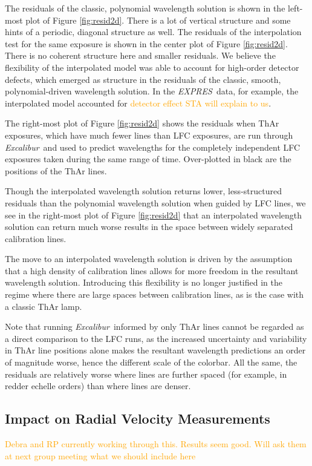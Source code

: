 \documentclass[modern]{aastex63}
\newcommand{\project}[1]{\textsl{#1}}
\newcommand{\name}{\project{Excalibur}}
\newcommand{\acronym}[1]{{\small{#1}}}
\newcommand{\expres}{\project{\acronym{EXPRES}}}
\newcommand{\lz}[1]{\textcolor{orange}{#1}}
\begin{document}
The residuals of the classic, polynomial wavelength solution is shown in the left-most plot of Figure \ref{fig:resid2d}.  There is a lot of vertical structure and some hints of a periodic, diagonal structure as well.  The residuals of the interpolation test for the same exposure is shown in the center plot of Figure \ref{fig:resid2d}.  There is no coherent structure here and smaller residuals.  We believe the flexibility of the interpolated model was able to account for high-order detector defects, which emerged as structure in the residuals of the classic, smooth, polynomial-driven wavelength solution.  In the \expres\ data, for example, the interpolated model accounted for \lz{detector effect STA will explain to us}.

The right-most plot of Figure \ref{fig:resid2d} shows the residuals when ThAr exposures, which have much fewer lines than LFC exposures, are run through \name\ and used to predict wavelengths for the completely independent LFC exposures taken during the same range of time.  Over-plotted in black are the positions of the ThAr lines.

Though the interpolated wavelength solution returns lower, less-structured residuals than the polynomial wavelength solution when guided by LFC lines, we see in the right-most plot of Figure \ref{fig:resid2d} that an interpolated wavelength solution can return much worse results in the space between widely separated calibration lines.

The move to an interpolated wavelength solution is driven by the assumption that a high density of calibration lines allows for more freedom in the resultant wavelength solution.  Introducing this flexibility is no longer justified in the regime where there are large spaces between calibration lines, as is the case with a classic ThAr lamp.

Note that running \name\ informed by only ThAr lines cannot be regarded as a direct comparison to the LFC runs, as the increased uncertainty and variability in ThAr line positions alone makes the resultant wavelength predictions an order of magnitude worse, hence the different scale of the colorbar.  All the same, the residuals are relatively worse where lines are further spaced (for example, in redder echelle orders) than where lines are denser.

\subsection{Impact on Radial Velocity Measurements}\label{sec:test-rv}
\lz{Debra and RP currently working through this.  Results seem good.  Will ask them at next group meeting what we should include here}
\end{document}
